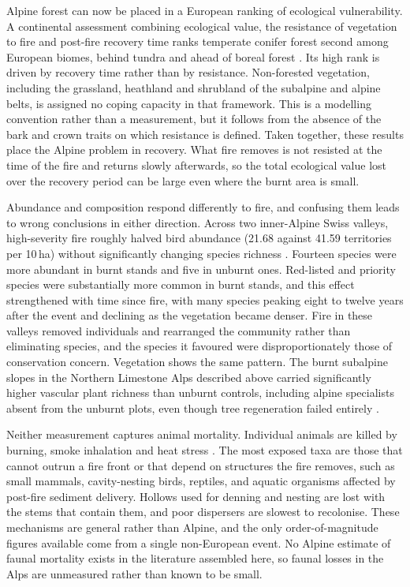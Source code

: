 \documentclass[11pt,a4paper]{article}
\begin{document}
Alpine forest can now be placed in a European ranking of ecological vulnerability. A continental assessment combining ecological value, the resistance of vegetation to fire and post-fire recovery time ranks temperate conifer forest second among European biomes, behind tundra and ahead of boreal forest \citep{arrogantefunes_mapping_2024}. Its high rank is driven by recovery time rather than by resistance. Non-forested vegetation, including the grassland, heathland and shrubland of the subalpine and alpine belts, is assigned no coping capacity in that framework. This is a modelling convention rather than a measurement, but it follows from the absence of the bark and crown traits on which resistance is defined. Taken together, these results place the Alpine problem in recovery. What fire removes is not resisted at the time of the fire and returns slowly afterwards, so the total ecological value lost over the recovery period can be large even where the burnt area is small.

Abundance and composition respond differently to fire, and confusing them leads to wrong conclusions in either direction. Across two inner-Alpine Swiss valleys, high-severity fire roughly halved bird abundance (21.68 against 41.59 territories per 10\,ha) without significantly changing species richness \citep{rey_effects_2019}. Fourteen species were more abundant in burnt stands and five in unburnt ones. Red-listed and priority species were substantially more common in burnt stands, and this effect strengthened with time since fire, with many species peaking eight to twelve years after the event and declining as the vegetation became denser. Fire in these valleys removed individuals and rearranged the community rather than eliminating species, and the species it favoured were disproportionately those of conservation concern. Vegetation shows the same pattern. The burnt subalpine slopes in the Northern Limestone Alps described above carried significantly higher vascular plant richness than unburnt controls, including alpine specialists absent from the unburnt plots, even though tree regeneration failed entirely \citep{degiuli_arrested_2024}.

Neither measurement captures animal mortality. Individual animals are killed by burning, smoke inhalation and heat stress \citep{demiguel_fires_2021}. The most exposed taxa are those that cannot outrun a fire front or that depend on structures the fire removes, such as small mammals, cavity-nesting birds, reptiles, and aquatic organisms affected by post-fire sediment delivery. Hollows used for denning and nesting are lost with the stems that contain them, and poor dispersers are slowest to recolonise. These mechanisms are general rather than Alpine, and the only order-of-magnitude figures available come from a single non-European event. No Alpine estimate of faunal mortality exists in the literature assembled here, so faunal losses in the Alps are unmeasured rather than known to be small.
\end{document}

